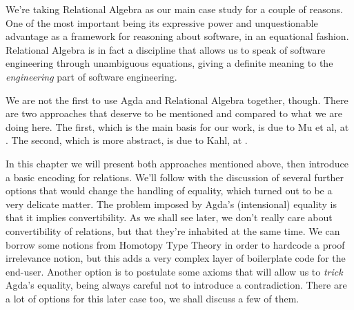 We're taking Relational Algebra\cite{Bird97} as our main case study for a couple of reasons. One of the most
important being its expressive power and unquestionable advantage as a framework for
reasoning about software, in an equational fashion. Relational Algebra is in fact a discipline that
allows us to speak of software engineering through unambiguous equations, giving a definite meaning
to the \emph{engineering} part of software engineering.

We are not the first to use Agda and Relational Algebra together, though. There are two approaches
that deserve to be mentioned and compared to what we are doing here. The first, which is the main
basis for our work, is due to Mu et al, at \cite{Jansson09}. The second, which is more abstract,
is due to Kahl, at \cite{RATHAgda}.

In this chapter we will present both approaches mentioned above, 
then introduce a basic encoding for relations. We'll follow with the discussion of several 
further options that would change the handling of equality, which turned out to be a very
delicate matter. The problem imposed by Agda's (intensional) equality is that it implies
convertibility. As we shall see later, we don't really care about convertibility of relations,
but that they're inhabited at the same time. We can borrow some notions from Homotopy Type Theory\cite{hottbook}
in order to hardcode a proof irrelevance notion, but this adds a very complex layer of boilerplate
code for the end-user. Another option is to postulate some axioms that will allow us to \emph{trick}
Agda's equality, being always careful not to introduce a contradiction. 
There are a lot of options for this later case too, we shall discuss a few of them.
